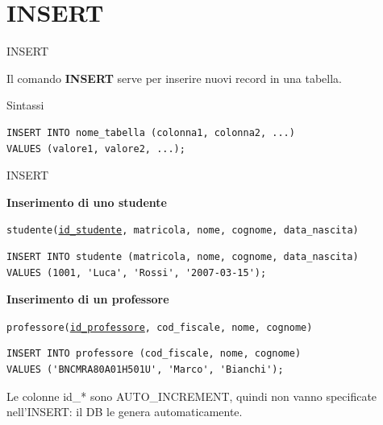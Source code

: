 \documentclass{beamer}
\begin{document}
\section{INSERT}


\begin{frame}[fragile]{INSERT}

Il comando \textbf{INSERT} serve per inserire nuovi record in una tabella.
\begin{block}{Sintassi}
\begin{verbatim}
INSERT INTO nome_tabella (colonna1, colonna2, ...)
VALUES (valore1, valore2, ...);
\end{verbatim}
\end{block}

\end{frame}

\begin{frame}[fragile]{INSERT}
\small

\textbf{Inserimento di uno studente}

\medskip
\texttt{studente(\underline{id\_studente}, matricola, nome, cognome, data\_nascita)}

\begin{verbatim}
INSERT INTO studente (matricola, nome, cognome, data_nascita)
VALUES (1001, 'Luca', 'Rossi', '2007-03-15');
\end{verbatim}

\medskip
\textbf{Inserimento di un professore}

\medskip
\texttt{professore(\underline{id\_professore}, cod\_fiscale, nome, cognome)}

\begin{verbatim}
INSERT INTO professore (cod_fiscale, nome, cognome)
VALUES ('BNCMRA80A01H501U', 'Marco', 'Bianchi');
\end{verbatim}

\medskip
Le colonne id\_* sono AUTO\_INCREMENT, quindi non vanno specificate
nell'INSERT: il DB le genera automaticamente.
\end{frame}
\end{document}
